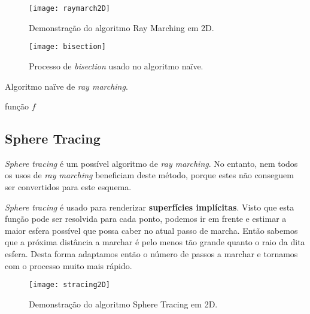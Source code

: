\begin{figure}[!htbp]
    \centering
    \texttt{[image: raymarch2D]}
    \caption[Demonstração do algoritmo Ray Marching em 2D]{Demonstração do algoritmo Ray Marching em 2D.}
    \label{fig::rmarching2D}
\end{figure}

\begin{figure}[!htbp]
    \centering
    \texttt{[image: bisection]}
    \caption[Processo de \textit{bisection} usado no algoritmo naïve]{Processo de \textit{bisection} usado no algoritmo naïve.}
    \label{fig::rmarching2DBisection}
\end{figure}

\begin{algorithm}[!htbp]
	\caption{Algoritmo naïve de \textit{ray marching}.}
	\label{alg::raymarch_naive}
	\begin{algorithmic}
\Require função $f$      
	\end{algorithmic}
\end{algorithm}


\subsection{Sphere Tracing}
\label{ssec::arte:raymarch:spheretracing}


\textit{Sphere tracing} é um possível algoritmo de \textit{ray marching}. No entanto, nem todos os usos de \textit{ray marching} beneficiam deste método, porque estes não conseguem ser convertidos para este esquema.

\textit{Sphere tracing} é usado para renderizar \textbf{superfícies implícitas}. Visto que esta função pode ser resolvida para cada ponto, podemos ir em frente e estimar a maior esfera possível que possa caber no atual passo de marcha. Então sabemos que a próxima distância a marchar é pelo menos tão grande quanto o raio da dita esfera. Desta forma adaptamos então o número de passos a marchar e tornamos com o processo muito mais rápido.

\begin{figure}[!htbp]
    \centering
    \texttt{[image: stracing2D]}
    \caption[Demonstração do algoritmo Sphere Tracing em 2D]{Demonstração do algoritmo Sphere Tracing em 2D.}
    \label{fig::stracing2D}
\end{figure}


